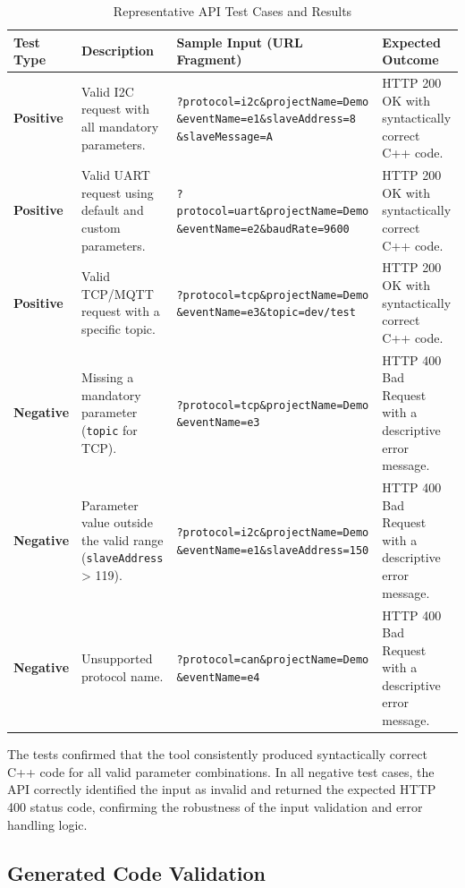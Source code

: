 \begin{table}[h!]
\centering
\caption{Representative API Test Cases and Results}
\label{tab:api_test_cases}
\begin{tabular}{|l|p{2.5cm}|p{6cm}|p{3.5cm}|}
\hline
\textbf{Test Type} & \textbf{Description} & \textbf{Sample Input (URL Fragment)} & \textbf{Expected Outcome} \\ \hline
\textbf{Positive} & Valid I2C request with all mandatory parameters. & \texttt{?protocol=i2c\&projectName=Demo \&eventName=e1\&slaveAddress=8 \&slaveMessage=A} & HTTP 200 OK with syntactically correct C++ code. \\ \hline
\textbf{Positive} & Valid UART request using default and custom parameters. & \texttt{?protocol=uart\&projectName=Demo \&eventName=e2\&baudRate=9600} & HTTP 200 OK with syntactically correct C++ code. \\ \hline
\textbf{Positive} & Valid TCP/MQTT request with a specific topic. & \texttt{?protocol=tcp\&projectName=Demo \&eventName=e3\&topic=dev/test} & HTTP 200 OK with syntactically correct C++ code. \\ \hline
\textbf{Negative} & Missing a mandatory parameter (\texttt{topic} for TCP). & \texttt{?protocol=tcp\&projectName=Demo \&eventName=e3} & HTTP 400 Bad Request with a descriptive error message. \\ \hline
\textbf{Negative} & Parameter value outside the valid range (\texttt{slaveAddress} > 119). & \texttt{?protocol=i2c\&projectName=Demo \&eventName=e1\&slaveAddress=150} & HTTP 400 Bad Request with a descriptive error message. \\ \hline
\textbf{Negative} & Unsupported protocol name. & \texttt{?protocol=can\&projectName=Demo \&eventName=e4} & HTTP 400 Bad Request with a descriptive error message. \\ \hline
\end{tabular}
\end{table}

  The tests confirmed that the tool consistently produced syntactically correct C++ code for all valid parameter combinations.   In all negative test cases, the API correctly identified the input as invalid and returned the expected HTTP 400 status code, confirming the robustness of the input validation and error handling logic.

\subsection{Generated Code Validation}
\label{subsec:code_validation}

